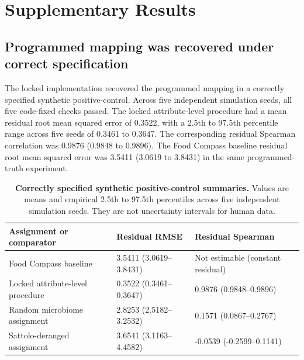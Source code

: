 \section{Supplementary Results}

\subsection*{Programmed mapping was recovered under correct specification}

The locked implementation recovered the programmed mapping in a correctly
specified synthetic positive-control. Across five independent simulation
seeds, all five code-fixed checks passed. The locked attribute-level procedure
had a mean residual root mean squared error of 0.3522, with a
2.5th to 97.5th percentile range across five seeds of 0.3461 to 0.3647. The
corresponding residual Spearman correlation was 0.9876 (0.9848 to 0.9896).
The Food Compass baseline residual root mean squared error was 3.5411 (3.0619
to 3.8431) in the same programmed-truth experiment.

\begin{table}[t]
\caption{\textbf{Correctly specified synthetic positive-control summaries.}
Values are means and empirical 2.5th to 97.5th percentiles across five
independent simulation seeds. They are not uncertainty intervals for human
data.}
\label{tab:supp_synthetic_positive_control}
\centering
\begin{tabular}{p{} p{} p{}}
\toprule
Assignment or comparator & Residual RMSE & Residual Spearman \\
\midrule
Food Compass baseline & 3.5411 (3.0619--3.8431) & Not estimable (constant residual) \\
Locked attribute-level procedure & 0.3522 (0.3461--0.3647) & 0.9876 (0.9848--0.9896) \\
Random microbiome assignment & 2.8253 (2.5182--3.2532) & 0.1571 (0.0867--0.2767) \\
Sattolo-deranged assignment & 3.6541 (3.1163--4.4582) & -0.0539 (-0.2599--0.1141) \\
\bottomrule
\end{tabular}
\end{table}

